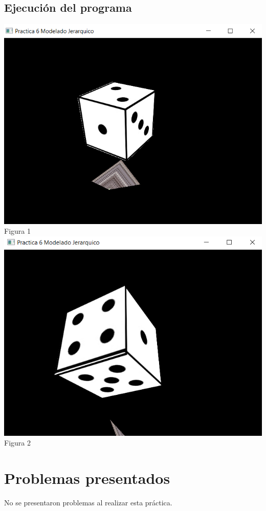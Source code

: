 \documentclass[12pt, a4paper]{article}
\begin{document}
\subsection{Ejecución del programa}	
\centering 
		\includegraphics[scale = .6]{img/dado1.png}\\[.05cm] %
		Figura 1\\[.65cm]
		\includegraphics[scale = .6]{img/dado2.png}\\[.05cm] %
		Figura 2\\[.65cm]

 \raggedright 
\vspace{.5cm}	
\section{Problemas presentados}
\justify
No se presentaron problemas al realizar esta práctica. \\[.4cm]
\end{document}
